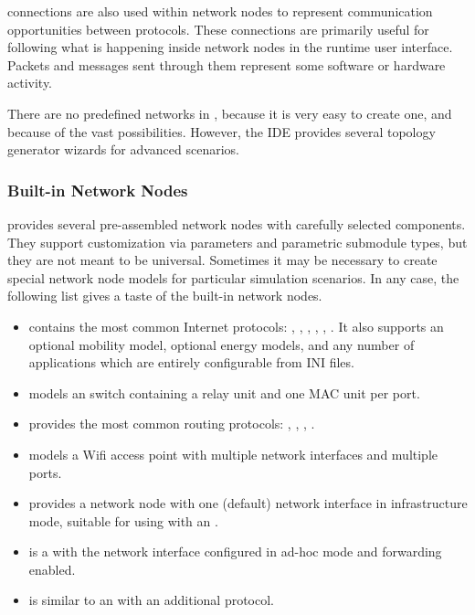 \omnet connections are also used within network nodes to represent communication opportunities between protocols. These connections are primarily useful for following what is happening inside network nodes in the runtime user interface. Packets and messages sent through them represent some software or hardware activity.

There are no predefined networks in \inet, because it is very easy to create one, and because of the vast possibilities. However, the \omnet IDE provides several topology generator wizards for advanced scenarios.

\subsubsection*{Built-in Network Nodes}

\inet provides several pre-assembled network nodes with carefully selected components. They support customization via parameters and parametric submodule types, but they are not meant to be universal. Sometimes it may be necessary to create special network node models for particular simulation scenarios. In any case, the following list gives a taste of the built-in network nodes.

\begin{itemize}
        \item {} contains the most common Internet protocols: , , , , , . It also supports an optional mobility model, optional energy models, and any number of applications which are entirely configurable from INI files.
        \item {} models an  switch containing a relay unit and one MAC unit per port.
        \item {} provides the most common routing protocols: , , , .
        \item {} models a Wifi access point with multiple  network interfaces and multiple  ports.
        \item {} provides a network node with one (default)  network interface in infrastructure mode, suitable for using with an .
        \item {} is a  with the network interface configured in ad-hoc mode and forwarding enabled.
        \item {} is similar to an  with an additional  protocol.
\end{itemize}


